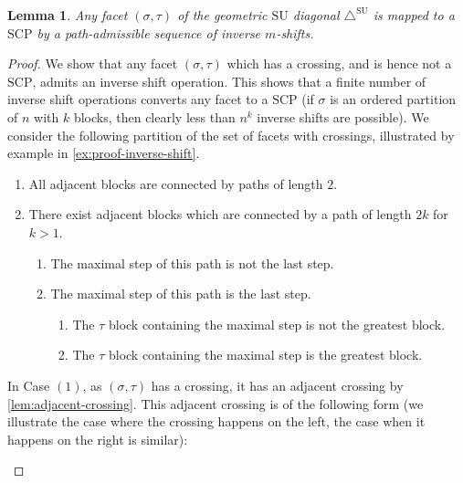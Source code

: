 \documentclass{amsart}
\newtheorem{lemma}[theorem]{Lemma}
\theoremstyle{definition}
\newcommand{\SU}{\mathrm{SU}}
\newcommand{\SUD}{\triangle^{\mathrm{SU}}}
\newcommand{\SCP}{\mathrm{SCP}}
\begin{document}
\begin{lemma}
\label{lem:inverse-to-SCP}
Any facet $(\sigma,\tau)$ of the geometric $\SU$ diagonal $\SUD$ is mapped to a $\SCP$ by a path-admissible sequence of inverse $m$-shifts.
\end{lemma}

\begin{proof}
We show that any facet $(\sigma,\tau)$ which has a crossing, and is hence not a $\SCP$, admits an inverse shift operation. 
This shows that a finite number of inverse shift operations converts any facet to a $\SCP$ (if $\sigma$ is an ordered partition of $n$ with $k$ blocks, then clearly less than $n^k$ inverse shifts are possible).
We consider the following partition of the set of facets with crossings, illustrated by example in \cref{ex:proof-inverse-shift}.
\begin{enumerate}
	\item All adjacent blocks are connected by paths of length $2$.
	\item There exist adjacent blocks which are connected by a path of length $2k$ for $k>1$.
	\begin{enumerate}
		\item The maximal step of this path is not the last step.
		\item The maximal step of this path is the last step.
		\begin{enumerate}
			\item The $\tau$ block containing the maximal step is not the greatest block.
			\item The $\tau$ block containing the maximal step is the greatest block.
		\end{enumerate}
	\end{enumerate}
\end{enumerate}
In Case $(1)$, as $(\sigma,\tau)$ has a crossing, it has an adjacent crossing by \cref{lem:adjacent-crossing}. 
This adjacent crossing is of the following form (we illustrate the case where the crossing happens on the left, the case when it happens on the right is similar): 
\begin{center}
\end{center}
\end{proof}
\end{document}
